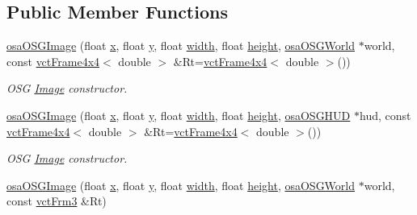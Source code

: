 \subsection*{Public Member Functions}
\begin{DoxyCompactItemize}
\item 
\hyperlink{classosa_o_s_g_image_ad68c98aa678b7e6dc4aa513f3cc872ad}{osa\+O\+S\+G\+Image} (float \hyperlink{classosa_o_s_g_image_a44d3e5d8face9e82282a356e4c4c3332}{x}, float \hyperlink{classosa_o_s_g_image_a6bee81116bbd53706ad648f61b74fc64}{y}, float \hyperlink{classosa_o_s_g_image_a9ba055113d2bcc4ec78db305f16fef4d}{width}, float \hyperlink{classosa_o_s_g_image_aaec6b37a20e1855336360b1825f7b4a6}{height}, \hyperlink{classosa_o_s_g_world}{osa\+O\+S\+G\+World} $\ast$world, const \hyperlink{classvct_frame4x4}{vct\+Frame4x4}$<$ double $>$ \&Rt=\hyperlink{classvct_frame4x4}{vct\+Frame4x4}$<$ double $>$())
\begin{DoxyCompactList}\small\item\em O\+S\+G \hyperlink{classosa_o_s_g_image_1_1_image}{Image} constructor. \end{DoxyCompactList}\item 
\hyperlink{classosa_o_s_g_image_a82b09045446070e84f1821b5847dfffe}{osa\+O\+S\+G\+Image} (float \hyperlink{classosa_o_s_g_image_a44d3e5d8face9e82282a356e4c4c3332}{x}, float \hyperlink{classosa_o_s_g_image_a6bee81116bbd53706ad648f61b74fc64}{y}, float \hyperlink{classosa_o_s_g_image_a9ba055113d2bcc4ec78db305f16fef4d}{width}, float \hyperlink{classosa_o_s_g_image_aaec6b37a20e1855336360b1825f7b4a6}{height}, \hyperlink{classosa_o_s_g_h_u_d}{osa\+O\+S\+G\+H\+U\+D} $\ast$hud, const \hyperlink{classvct_frame4x4}{vct\+Frame4x4}$<$ double $>$ \&Rt=\hyperlink{classvct_frame4x4}{vct\+Frame4x4}$<$ double $>$())
\begin{DoxyCompactList}\small\item\em O\+S\+G \hyperlink{classosa_o_s_g_image_1_1_image}{Image} constructor. \end{DoxyCompactList}\item 
\hyperlink{classosa_o_s_g_image_ad65ad3849f4cb3c7f639c1b844f0f833}{osa\+O\+S\+G\+Image} (float \hyperlink{classosa_o_s_g_image_a44d3e5d8face9e82282a356e4c4c3332}{x}, float \hyperlink{classosa_o_s_g_image_a6bee81116bbd53706ad648f61b74fc64}{y}, float \hyperlink{classosa_o_s_g_image_a9ba055113d2bcc4ec78db305f16fef4d}{width}, float \hyperlink{classosa_o_s_g_image_aaec6b37a20e1855336360b1825f7b4a6}{height}, \hyperlink{classosa_o_s_g_world}{osa\+O\+S\+G\+World} $\ast$world, const \hyperlink{vct_transformation_types_8h_a81feda0a02c2d1bc26e5553f409fed20}{vct\+Frm3} \&Rt)

\end{DoxyCompactItemize}

